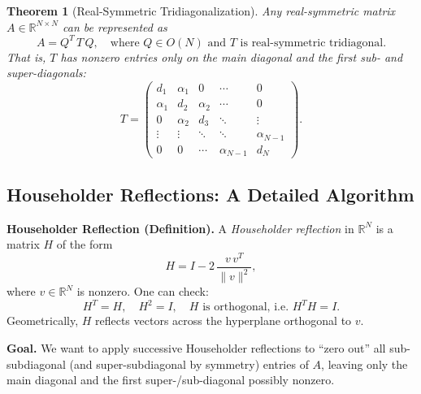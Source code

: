 \documentclass[letterpaper,11pt,oneside,reqno]{article}
\numberwithin{equation}{section}
\newtheorem{theorem}[proposition]{Theorem}
\theoremstyle{definition}
\begin{document}
\begin{theorem}[Real-Symmetric Tridiagonalization]
\label{thm:tridiagonal}
Any real-symmetric matrix \(A\in\mathbb{R}^{N\times N}\) can be represented as
\[
  A = Q^T\, T\, Q,
  \quad
  \text{where } Q\in O(N)
  \text{ and } T\text{ is real-symmetric tridiagonal.}
\]
That is, \(T\) has nonzero entries only on the main diagonal and the first sub- and super-diagonals:
\[
  T = \begin{pmatrix}
         d_1 & \alpha_1 & 0 & \cdots & 0\\
         \alpha_1 & d_2 & \alpha_2 & \cdots & 0\\
         0 & \alpha_2 & d_3 & \ddots & \vdots\\
         \vdots & \vdots & \ddots & \ddots & \alpha_{N-1}\\
         0 & 0 & \cdots & \alpha_{N-1} & d_N
       \end{pmatrix}.
\]
\end{theorem}

\subsection{Householder Reflections: A Detailed Algorithm}

\noindent
\textbf{Householder Reflection (Definition).}
A \emph{Householder reflection} in \(\mathbb{R}^N\) is a matrix \(H\) of the form
\[
  H = I - 2\,\frac{v\,v^T}{\|v\|^2},
\]
where \(v\in\mathbb{R}^N\) is nonzero. One can check:
\[
  H^T = H,\quad
  H^2 = I,\quad
  H\text{ is orthogonal, i.e.\ }H^T H = I.
\]
Geometrically, \(H\) reflects vectors across the hyperplane orthogonal to \(v\).

\medskip
\noindent
\textbf{Goal.}
We want to apply successive Householder reflections to “zero out” all sub-subdiagonal (and super-subdiagonal by symmetry) entries of \(A\), leaving only the main diagonal and the first super-/sub-diagonal possibly nonzero.
\end{document}
